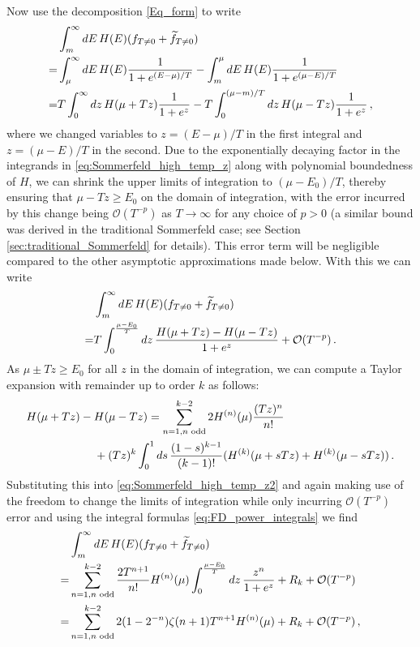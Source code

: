 \documentclass[sn-mathphys,Numbered]{sn-jnl}
\begin{document}
Now use  the decomposition \eqref{Eq_form} to write
\begin{align}
    &\int_m^\infty dE\, H(E)(f_{T\neq 0}+\widetilde{f}_{T\neq 0})\notag\\
    =&\int_\mu^\infty dE \,H(E)\frac{1}{1+e^{(E-\mu)/T}}-\int_m^\mu dE\, H(E)\frac{1}{1+e^{(\mu-E)/T}}\notag\\
=&T\int_0^\infty dz \,H(\mu+Tz)\frac{1}{1+e^{z}}-T\int^{(\mu-m)/T}_0 dz\, H(\mu-Tz)\frac{1}{1+e^{z}}\,,\label{eq:Sommerfeld_high_temp_z}
\end{align}
where we changed variables to $z=(E-\mu)/T$ in the first integral and $z=(\mu-E)/T$ in the second.  Due to the exponentially decaying factor in the integrands in \eqref{eq:Sommerfeld_high_temp_z} along with polynomial boundedness of $H$, we can shrink the upper limits of integration  to $(\mu-E_0)/T$, thereby ensuring that $\mu-Tz\geq E_0$ on the domain of integration, with the  error incurred by this change being $\mathcal{O}(T^{-p})$ as $T\to \infty$ for any choice of $p>0$ (a similar bound was derived in the traditional Sommerfeld case; see Section \ref{sec:traditional_Sommerfeld} for details). This error term will be negligible compared to the other asymptotic approximations made below.  With this we can write
\begin{align}
    &\int_m^\infty dE\, H(E)(f_{T\neq 0}+\widetilde{f}_{T\neq 0})\notag\\
=&T\int_0^{\frac{\mu-E_0}{T}} dz \,\frac{H(\mu+Tz)- H(\mu-Tz)}{1+e^{z}}+\mathcal{O}(T^{-p})\,. \label{eq:Sommerfeld_high_temp_z2}
\end{align}
As $\mu\pm Tz\geq E_0$ for all $z$ in the domain of integration, we can compute a Taylor expansion with remainder up to order $k$ as follows:
\begin{align}
 &H(\mu+Tz)- H(\mu-Tz)=\sum_{n=1,n\text{ odd}}^{k-2} 2H^{(n)}(\mu)\frac{(Tz)^n}{n!}\\
 &\qquad\qquad\qquad+(Tz)^k \int_0^1 ds\,\frac{(1-s)^{k-1}}{(k-1)!} (H^{(k)}(\mu+sTz)+H^{(k)}(\mu-sTz))\,. \notag
\end{align}
Substituting this into \eqref{eq:Sommerfeld_high_temp_z2} and again making use of the freedom to change the limits of integration while only incurring $\mathcal{O}(T^{-p})$ error and using the integral formulas \eqref{eq:FD_power_integrals} we find
\begin{align}
    &\int_m^\infty dE\, H(E)(f_{T\neq 0}+\widetilde{f}_{T\neq 0})\notag\\
    =&\sum_{n=1,n\text{ odd}}^{k-2} \frac{2T^{n+1}}{n!}H^{(n)}(\mu)\int_0^{\frac{\mu-E_0}{T}} dz \,\frac{z^n}{1+e^{z}}+R_k
+\mathcal{O}(T^{-p})\notag\\
=&\sum_{n=1,n\text{ odd}}^{k-2} 2(1-2^{-n})\zeta(n+1)T^{n+1}H^{(n)}(\mu)
+R_k
+\mathcal{O}(T^{-p})\,,\label{eq:Sommerfeld_high_temp_z3}
\end{align}
\end{document}
